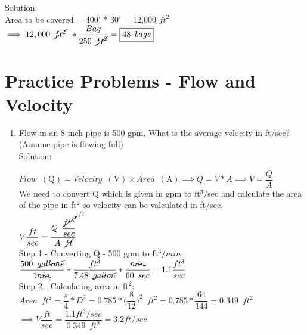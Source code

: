 \begin{enumerate}
\vspace{0.2cm}
Solution:\\
\vspace{0.2cm}
Area to be covered = 400' * 30' = 12,000 $ft^2$
\vspace{0.2cm}
$\implies 12,000 \enspace \cancel{ft^2} \enspace * \dfrac{Bag}{250 \enspace \cancel{ft^2}}=\boxed{48 \enspace bags}$


\end{enumerate}

\section*{Practice Problems - Flow and Velocity}
\begin{enumerate}

\item Flow in an 8-inch pipe is 500 gpm. What is the average velocity in ft/sec? (Assume pipe is flowing full)\\
Solution:\\
\vspace{0.2cm}

$Flow \enspace(\mathrm{Q})= Velocity \enspace(\mathrm{V})  \times Area \enspace(\mathrm{A}) \implies Q=V*A \implies V=\dfrac{Q}{A}$\\
We need to convert Q which is given in gpm to ft${^3}$/sec and calculate the area of the pipe in ft${^2}$ so velocity can be valculated in ft/sec.\\
\vspace{0.2cm}
$ V \dfrac{ft}{sec} = \dfrac{Q \enspace \dfrac{\cancelto{ft}{ft^3}}{sec}}{A \enspace\cancel{ft}}$\\
\vspace{0.2cm}
Step 1 - Converting Q - 500 gpm to ft${^3}/min$:\\
\vspace{0.2cm}
$\dfrac{500 \enspace \cancel{gallons}}{\bcancel{min}}*\dfrac{ft^3}{7.48 \enspace \cancel{gallon}}*\dfrac{\bcancel{min}}{60 \enspace sec}=1.1\dfrac{ft^3}{sec}$\\
\vspace{0.2cm}
Step 2 - Calculating area in ft${^2}$:\\
\vspace{0.2cm}
$Area \enspace ft^2= \dfrac{\pi}{4}*D^2= 0.785*\Big(\dfrac{8}{12}\Big)^2 \enspace ft^2=0.785*\dfrac{64}{144}=0.349 \enspace ft^2$\\
\vspace{0.2cm}
$\implies V \dfrac{ft}{sec} = \dfrac{ 1.1 ft^3/sec}{0.349 \enspace ft^2} = \boxed{3.2 ft/sec}$\\
\vspace{0.3cm} 



\end{enumerate}
